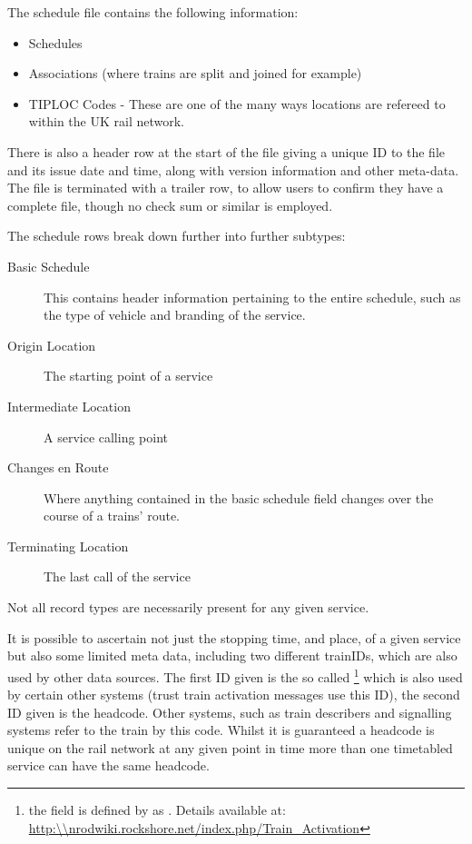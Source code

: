 The schedule file contains the following information:
\begin{itemize}
	\item Schedules
	\item Associations (where trains are split and joined for example)
	\item TIPLOC Codes - These are one of the many ways locations are refereed to within the  UK rail network.
\end{itemize}

There is also a header row at the start of the file giving a unique ID to the file and its issue date and time, along with version information and other meta-data. The file is terminated with a trailer row, to allow users to confirm they have a complete file, though no check sum or similar is employed.

The schedule rows break down further into further subtypes:
\begin{description}
	\item[Basic Schedule] This contains header information pertaining to the entire schedule, such as the type of vehicle and branding of the service.
	\item[Origin Location] The starting point of a service
	\item[Intermediate Location]  A service calling point
	\item[Changes en Route] Where anything contained in the basic schedule field changes over the course of a trains' route.
	\item[Terminating Location] The last call of the service
\end{description}
Not all record types are necessarily present for any given service.

It is possible to ascertain not just the stopping time, and place, of a given service but also some limited meta data, including two different trainIDs, which are also used by other data sources. The first ID given is the so called \footnote{the field is defined by \citet{Hicks} as . Details available at: \url{http:\\nrodwiki.rockshore.net/index.php/Train_Activation}} which is also used by certain other systems (trust train activation messages use this ID), the second ID given is the headcode. Other systems, such as train describers and signalling systems refer to the train by this code. Whilst it is guaranteed a headcode is unique on the rail network at any given point in time more than one timetabled service can have the same headcode.

